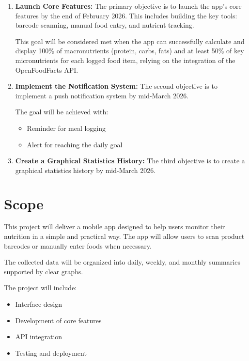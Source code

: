 \documentclass[11pt,a4paper]{article}
\begin{document}
    \begin{enumerate}

        \item \textbf{Launch Core Features:}
        The primary objective is to launch the app's core features by the end of February 2026. This includes building the key tools: barcode scanning, manual food entry, and nutrient tracking.

        This goal will be considered met when the app can successfully calculate and display 100\% of macronutrients (protein, carbs, fats) and at least 50\% of key micronutrients for each logged food item, relying on the integration of the OpenFoodFacts API.

        \item \textbf{Implement the Notification System:}
        The second objective is to implement a push notification system by mid-March 2026.

        The goal will be achieved with:

        \begin{itemize}
            \item Reminder for meal logging
            \item Alert for reaching the daily goal
        \end{itemize}

        \item \textbf{Create a Graphical Statistics History:}
        The third objective is to create a graphical statistics history by mid-March 2026.

    \end{enumerate}

    \section*{Scope}

    This project will deliver a mobile app designed to help users monitor their nutrition in a simple and practical way. The app will allow users to scan product barcodes or manually enter foods when necessary.

    The collected data will be organized into daily, weekly, and monthly summaries supported by clear graphs.

    The project will include:

    \begin{itemize}
        \item Interface design
        \item Development of core features
        \item API integration
        \item Testing and deployment
    \end{itemize}
\end{document}
